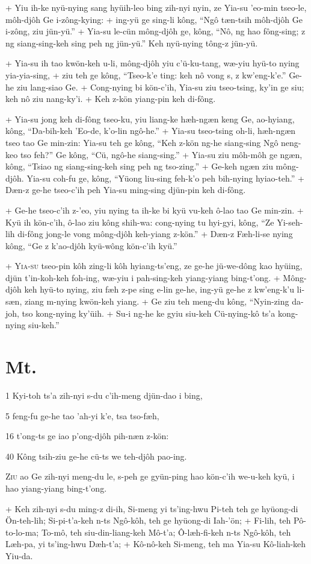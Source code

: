 +	Yiu ih-ke nyü-nying sang hyüih-leo bing zih-nyi nyin, ze Yia-su 'eo-min tseo-le, môh-djôh Ge i-zông-kying:
+	ing-yü ge sing-li kông, ``Ngô tæn-tsih môh-djôh Ge i-zông, ziu jün-yü.''
+	Yia-su le-cün mông-djôh ge, kông, ``Nô, ng hao fông-sing; z ng siang-sing-keh sing peh ng jün-yü.'' Keh nyü-nying tông-z jün-yü.
\par
+	Yia-su ih tao kwön-keh u-li, mông-djôh yiu c'ü-ku-tang, wæ-yiu hyü-to nying yia-yia-sing,
+	ziu teh ge kông, ``Tseo-k'e ting: keh nô vong s, z kw'eng-k'e.'' Ge-he ziu lang-siao Ge.
+	Cong-nying bi kön-c'ih, Yia-su ziu tseo-tsing, ky'in ge siu; keh nô ziu nang-ky'i.
+	Keh z-kön yiang-pin keh di-fông.
\par
+	Yia-su jong keh di-fông tseo-ku, yiu liang-ke hæh-ngæn keng Ge, ao-hyiang, kông, ``Da-bih-keh 'Eo-de, k'o-lin ngô-he.''
+	Yia-su tseo-tsing oh-li, hæh-ngæn tseo tao Ge min-zin: Yia-su teh ge kông, ``Keh z-kön ng-he siang-sing Ngô neng-keo tso feh?'' Ge kông, ``Cü, ngô-he siang-sing.''
+	Yia-su ziu môh-môh ge ngæn, kông, ``Tsiao ng siang-sing-keh sing peh ng tso-zing.''
+	Ge-keh ngæn ziu mông-djôh. Yia-su coh-fu ge, kông, ``Yüong liu-sing feh-k'o peh bih-nying hyiao-teh.''
+	Dæn-z ge-he tseo-c'ih peh Yia-su ming-sing djün-pin keh di-fông.
\par
+	Ge-he tseo-c'ih z-'eo, yiu nying ta ih-ke bi kyü vu-keh ô-lao tao Ge min-zin.
+	Kyü ih kön-c'ih, ô-lao ziu kông shih-wa: cong-nying tu hyi-gyi, kông, ``Ze Yi-seh-lih di-fông jong-le vong mông-djôh keh-yiang z-kön.''
+	Dæn-z Fæh-li-se nying kông, ``Ge z k'ao-djôh kyü-wông kön-c'ih kyü.''
\par
+	\textsc{Yia-su} tseo-pin kôh zing-li kôh hyiang-ts'eng, ze ge-he jü-we-dông kao hyüing, djün t'in-koh-keh foh-ing, wæ-yiu i pah-sing-keh yiang-yiang bing-t'ong.
+	Mông-djôh keh hyü-to nying, ziu fæh z-pe sing e-lin ge-he, ing-yü ge-he z kw'eng-k'u li-sæn, ziang m-nying kwön-keh yiang.
+	Ge ziu teh meng-du kông, ``Nyin-zing da-joh, tso kong-nying ky'üih.
+	Su-i ng-he ke gyiu siu-keh Cü-nying-kô ts'a kong-nying siu-keh.''



\section{Mt.}%

\begin{sAbstract}
	\item[1] Kyi-toh ts'a zih-nyi s-du c'ih-meng djün-dao i bing,
	\item[5] feng-fu ge-he tao 'ah-yi k'e, tsa tso-fæh,
	\item[16] t'ong-ts ge iao p'ong-djôh pih-næn z-kön:
	\item[40] Kông tsih-ziu ge-he cü-ts we teh-djôh pao-ing.
\end{sAbstract}

\header
\lettrine{Z}{iu} ao Ge zih-nyi meng-du le, s-peh ge gyün-ping hao kön-c'ih we-u-keh kyü, i hao yiang-yiang bing-t'ong.
\par
+	Keh zih-nyi s-du ming-z di-ih, Si-meng yi ts'ing-hwu Pi-teh teh ge hyüong-di Ön-teh-lih; Si-pi-t'a-keh n-ts Ngô-kôh, teh ge hyüong-di Iah-'ön;
+	Fi-lih, teh Pô-to-lo-ma; To-mô, teh siu-din-liang-keh Mô-t'a; Ô-læh-fi-keh n-ts Ngô-kôh, teh Læh-pa, yi ts'ing-hwu Dæh-t'a;
+	Kô-nô-keh Si-meng, teh ma Yia-su Kô-liah-keh Yiu-da.